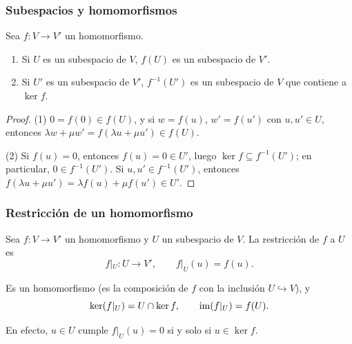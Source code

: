 \begin{frame}
    \frametitle{Subespacios y homomorfismos}

    \begin{proposition}
        Sea $f\colon V\to V'$ un homomorfismo.
        \begin{enumerate}[(1)]
            \item Si $U$ es un subespacio de $V$, $f(U)$ es un subespacio
            de $V'$.
            \item Si $U'$ es un subespacio de $V'$, $f^{-1}(U')$ es un
            subespacio de $V$ que contiene a $\ker f$.
        \end{enumerate}
    \end{proposition}

    \begin{proof}
        \alert{(1)} $0=f(0)\in f(U)$, y si $w=f(u)$, $w'=f(u')$ con
        $u,u'\in U$, entonces $\lambda w+\mu w'=f(\lambda u+\mu u')\in f(U)$.

        \alert{(2)} Si $f(u)=0$, entonces $f(u)=0\in U'$, luego
        $\ker f\subseteq f^{-1}(U')$; en particular, $0\in f^{-1}(U')$. Si
        $u,u'\in f^{-1}(U')$, entonces
        $f(\lambda u+\mu u')=\lambda f(u)+\mu f(u')\in U'$.
    \end{proof}
\end{frame}


\begin{frame}
    \frametitle{Restricción de un homomorfismo}

    \begin{definition}
        Sea $f\colon V\to V'$ un homomorfismo y $U$ un subespacio de $V$.
        La \alert{restricción} de $f$ a $U$ es
        \[
            f|_U\colon U\longrightarrow V',\qquad f|_U(u)=f(u).
        \]
    \end{definition}

    Es un homomorfismo (es la composición de $f$ con la inclusión
    $U\hookrightarrow V$), y
    \[
        \ker(f|_U)=U\cap\ker f,
        \qquad
        \operatorname{im}(f|_U)=f(U).
    \]

    \medskip

    En efecto, $u\in U$ cumple $f|_U(u)=0$ si y solo si $u\in\ker f$.
\end{frame}


